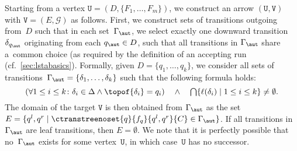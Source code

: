 Starting from a vertex $\mathtt{U}=(D,\{F_1,\ldots,F_m\})$, we construct an arrow $(\mathtt{U},\mathtt{V})$ with $\mathtt{V}=(E,\mathcal{G})$ as follows.
First, we construct sets of transitions outgoing from~$D$ such that in each
set~$\Gamma_\aut$, we select exactly one downward
transition $\delta_{q_\aut}$ originating from each $q_\aut \in D$, such that
all transitions in $\Gamma_\aut$ share a~common choice (as required by the
definition of an accepting run (cf.\ \cref{sec:lstabasics}).
Formally, given $D = \{q_1, \ldots, q_k\}$, we consider all sets of
transitions~$\Gamma_\aut = \{\delta_1, \ldots, \delta_k\}$ such that the following formula holds:
%
\begin{equation}\label{eq:gamma_aut}
  \left(\forall 1\le i\le k\colon \delta_i\in\Delta \land \topof{\delta_i}=q_i\right)\quad \land \quad \textstyle\bigcap\{\ell(\delta_i) \mid 1\le i\le k\}\ne\emptyset.
\end{equation}
The domain of the target
$\mathtt{V}$ is then obtained from $\Gamma_\aut$ as the set 
$E = \{q^l,q^r \mid  \ctranstreenoset{q}{f_q}{q^l,q^r}{C} \in \Gamma_\aut\}$.
If all transitions in~$\Gamma_\aut$ are leaf transitions, then $E = \emptyset$.
We note that it is perfectly possible that no~$\Gamma_\aut$ exists for some
vertex~$\mathtt{U}$, in which case~$\mathtt{U}$ has no successor.

